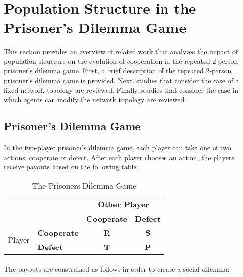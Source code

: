 \documentclass{article}
\begin{document}
    \section{Population Structure in the Prisoner’s Dilemma Game}
    \paragraph{}This section provides an overview of related work that analyzes the impact of population structure on the evolution of cooperation in the repeated 2-person prisoner’s dilemma game.  First, a brief description of the repeated 2-person prisoner’s dilemma game is provided.  Next, studies that consider the case of a fixed network topology are reviewed.  Finally, studies that consider the case in which agents can modify the network topology are reviewed.
    
    \subsection{Prisoner’s Dilemma Game}
    \paragraph{}In the two-player prisoner’s dilemma game, each player can take one of two actions: cooperate or defect.  After each player chooses an action, the players receive payouts based on the following table:
    
    \begin{table}[h!]
      \begin{center}
        \caption{The Prisoners Dilemma Game}
        \label{tab:pdgame}
        \begin{tabular}{l|l|c|c}
          \toprule
          \multicolumn{2}{c|}{\multirow{2}{*}{}} & \multicolumn{2}{c|}{\textbf{Other Player}}\\
          \multicolumn{2}{c|}{} & \textbf{Cooperate} & \textbf{Defect}\\
          \midrule
          \multirow{2}{*}{Player} & \textbf{Cooperate} & \textbf{R} & \textbf{S}\\
            & \textbf{Defect} & \textbf{T} & \textbf{P}
          \bottomrule
        \end{tabular}
      \end{center}
    \end{table}
    
    \paragraph{}The payouts are constrained as follows in order to create a social dilemma:
    
\end{document}
